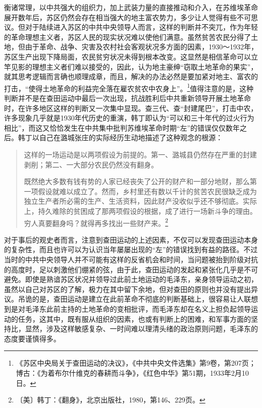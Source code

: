 衡诸常理，以中共强大的组织力，加上武装力量的直接推动和介入，在苏维埃革命展开数年后，苏区仍然会存在相当强大的地主富农势力，多少让人觉得有些不可思议。但对于陆续进入苏区的中共中央领导人而言，这样的判断并不突兀，作为年轻的革命理想主义者，苏区人民的现实状况难以使他们满意。虽然贫苦农民分得了土地，但由于革命、战争、灾害及农村社会客观状况多方面的因素，1930～1932年，苏区生产出现下降局面，农民贫穷状况未得到根本改变。这显然是相信革命可以立竿见影的理想主义者们难以接受的，因此，认为地主豪绅“窃取土地革命的果实”，就其思考逻辑而言确也顺理成章，而且，解决的办法必然是要加紧对地主、富农的打击，“使得土地革命的利益完全落在雇农贫农中农身上”。\footnote{《苏区中央局关于查田运动的决议》，《中共中央文件选集》第9卷，第207页；博古：《为着布尔什维克的春耕而斗争》，《红色中华》第51期，1933年2月10日。}值得注意的是，这种判断并不是在查田运动中最后一次出现，抗战胜利后中共重新领导开展土地革命时，在许多地区这样的判断又一次集中显现。查三代、查“封建尾巴”，打击中农，许多现象几乎就是1930年代历史的重演，韩丁即认为“可以和三十年代的过火行为相比”，而这又恰恰发生在中共集中批判苏维埃革命时期“左”的错误仅仅数年之后。韩丁以自己在潞城张庄的实际经历生动地描述了这种观念的根源：

\begin{quote}

这样的一场运动是以两项假设为前提的。第一、潞城县仍然存在严重的封建剥削；第二、一大部分农民仍然没有翻身。

既然绝大多数有钱有势的人家已经丧失了公开的财产和一部分地财，那么第一项假设就难以成立了。然而，乡村里还有数以千计的贫苦农民很缺乏成为独立生产者所必需的生产、生活资料，因此财产没收似乎还不够彻底。实际上，持久难除的贫困成了那两项假设的根据，成了进行一场新斗争的理由。穷人真要翻身吗？就得再多找出一些财产来。\footnote{〔美〕韩丁：《翻身》，北京出版社，1980，第146、229页。}
\end{quote}


对于事后的观史者而言，注意到查田运动的上述因素，不仅可以发现查田运动本身的复杂性，而且也许可以为认识当年屡屡出现的“左”的错误找到有益的路径。不过当时的中共中央领导人并不可能有这样的反省机会和时间，当问题被抬到阶级对抗的高度时，足以刺激他们绷紧的弦，由于此，查田运动的发起和紧张化几乎是不可避免。即使是熟谙苏区状况并领导过此前土地运动的毛泽东，亲身领导运动之初，虽然以自己对苏区的了解，极力在其中留下余地，但对查田的原则也并没有提出异议。吊诡的是，查田运动是建立在此前革命不彻底的判断基础上，很容易让人联想到是对毛泽东此前主持的土地革命的变相批评，而毛泽东却在名义上担负起领导运动的任务，这其中，既有服从组织的因素，也或有判断上的困难，和军事方面的坚持比，显然，涉及这样敏感复杂、一时间难以理清头绪的政治原则问题，毛泽东的态度要谨慎得多。


